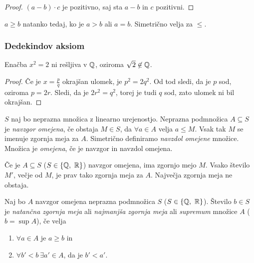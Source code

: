 \documentclass[12pt, a4paper]{article}
\begin{document}
\begin{proof}
$(a-b)\cdot c$ je pozitivno, saj sta $a-b$ in $c$ pozitivni.
\end{proof}

\begin{definicija}
$a\geq b$ natanko tedaj, ko je $a>b$ ali $a=b$. Simetrično velja za $\leq$.
\end{definicija}

\newpage

\subsubsection{Dedekindov aksiom}


\begin{trditev}\label{o3}
Enačba $x^2=2$ ni rešljiva v $\mathbb{Q}$, oziroma $\sqrt{2}\not\in\mathbb{Q}$.
\end{trditev}

\begin{proof}
Če je $x=\frac{p}{q}$ okrajšan ulomek, je $p^2=2q^2$. Od tod sledi, da je $p$ sod, oziroma $p=2r$. Sledi, da je $2r^2=q^2$, torej je tudi $q$ sod, zato ulomek ni bil okrajšan.
\end{proof}

\begin{definicija}
$S$ naj bo neprazna množica z linearno urejenostjo. Neprazna podmnožica $A\subseteq S$ je \emph{navzgor omejena}, če obstaja $M\in S$, da $\forall a\in A$ velja $a\leq M$. Vsak tak $M$ se imenuje zgornja meja za $A$. Simetrično definiramo \emph{navzdol omejene} množice. Množica je \emph{omejena}, če je navzgor in navzdol omejena.
\end{definicija}

\begin{opomba}
Če je $A\subseteq S$ ($S\in\left\{\mathbb{Q},~\mathbb{R}\right\}$) navzgor omejena, ima zgornjo mejo $M$. Vsako število $M'$, večje od $M$, je prav tako zgornja meja za $A$. Največja zgornja meja ne obstaja.
\end{opomba}

\begin{definicija}
Naj bo $A$ navzgor omejena neprazna podmnožica $S$ ($S\in\left\{\mathbb{Q},~\mathbb{R}\right\}$). Število $b\in S$ je \emph{natančna zgornja meja} ali \emph{najmanjša zgornja meja} ali \emph{supremum} množice $A$ ($b=\sup A$), če velja

\begin{enumerate}[label=(\roman*)]
\item $\forall a\in A$ je $a\geq b$ in
\item $\forall b'<b~\exists a'\in A$, da je $b'<a'$.
\end{enumerate}
\end{definicija}
\end{document}
